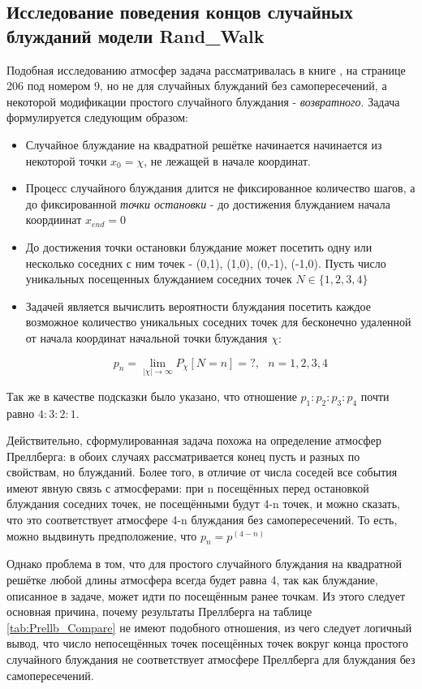 \subsection{Исследование поведения концов случайных блужданий модели Rand\_Walk}

Подобная исследованию атмосфер \cite{owczarek2008scaling} задача рассматривалась в книге \cite{Spitser1969}, на странице 206 под номером 9, но не для случайных блужданий без самопересечений, а некоторой модификации простого случайного блуждания - \textit{возвратного}. Задача формулируется следующим образом:

\begin{itemize}
    \item Случайное блуждание на квадратной решётке начинается начинается из некоторой точки $x_0 = \chi$, не лежащей в начале координат.
    \item Процесс случайного блуждания длится не фиксированное количество шагов, а до фиксированной \textit{точки остановки} - до достижения блужданием начала коордиинат $x_{end} = 0$
    \item До достижения точки остановки блуждание может посетить одну или несколько соседних с ним точек - (0,1), (1,0), (0,-1), (-1,0). Пусть число уникальных посещенных блужданием соседних точек  $N \in \{1, 2, 3, 4\}$
    \item Задачей является вычислить вероятности блуждания посетить каждое возможное количество уникальных соседних точек для бесконечно удаленной от начала координат начальной точки блуждания $\chi$:
    
    \[ p_{n} = \lim_{|\chi|\to \infty} P_{\chi}[N = n] = ?,\ \ \ n = 1, 2, 3, 4\]
\end{itemize}

Так же в качестве подсказки было указано, что отношение $p_1:p_2:p_3:p_4$ почти равно $4:3:2:1$.

Действительно, сформулированная задача похожа на определение атмосфер Преллберга: в обоих случаях рассматривается конец пусть и разных по свойствам, но блужданий. Более того, в отличие от числа соседей все события имеют явную связь с атмосферами: при n посещённых перед остановкой блуждания соседних точек, не посещёнными будут 4-n точек, и можно сказать, что это соответствует атмосфере 4-n блуждания без самопересечений. То есть, можно выдвинуть предположение, что $p_n = p^{(4-n)}$

Однако проблема в том, что для простого случайного блуждания на квадратной решётке любой длины атмосфера всегда будет равна 4, так как блуждание, описанное в задаче, может идти по посещённым ранее точкам. Из этого следует основная причина, почему результаты Преллберга на таблице \ref{tab:Prellb_Compare} не имеют подобного отношения, из чего следует логичный вывод, что число непосещённых точек посещённых точек вокруг конца простого случайного блуждания не соответствует атмосфере Преллберга для блуждания без самопересечений.

